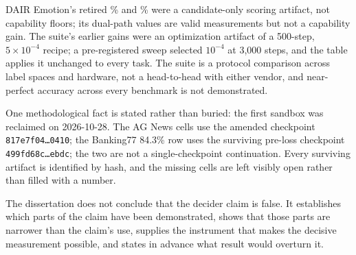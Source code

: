 DAIR Emotion's retired \SuiteSmallPriorEmotion\% and \SuiteMidPriorEmotion\% were
a candidate-only scoring artifact, not capability floors; its dual-path values
are valid measurements but not a capability gain. The suite's earlier gains were
an optimization artifact of a 500-step, \(5\times10^{-4}\) recipe; a
pre-registered sweep selected \(10^{-4}\) at 3,000 steps, and the table applies
it unchanged to every task. The suite is a protocol comparison across label
spaces and hardware, not a head-to-head with either vendor, and near-perfect
accuracy across every benchmark is not demonstrated.


One methodological fact is stated rather than buried: the first sandbox was
reclaimed on 2026-10-28. The AG News cells use the amended checkpoint
\texttt{817e7f04\ldots0410}; the Banking77 84.3\% row uses the surviving pre-loss
checkpoint \texttt{499fd68c\ldots ebdc}; the two are not a single-checkpoint
continuation. Every surviving artifact is identified by hash, and the missing
cells are left visibly open rather than filled with a number.

The dissertation does not conclude that the decider claim is false. It establishes
which parts of the claim have been demonstrated, shows that those parts are
narrower than the claim's use, supplies the instrument that makes the decisive
measurement possible, and states in advance what result would overturn it.
